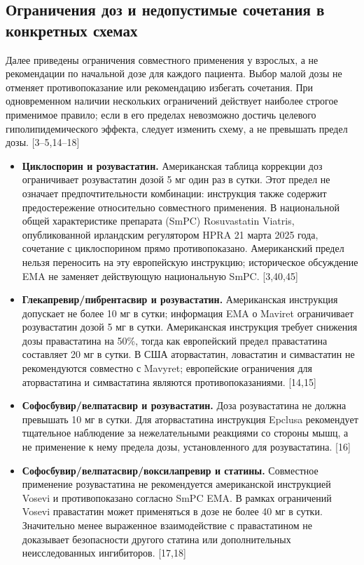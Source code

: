 \documentclass[11pt]{article}
\begin{document}
\subsection{Ограничения доз и недопустимые сочетания в конкретных схемах}

Далее приведены ограничения совместного применения у взрослых, а не рекомендации по начальной дозе для каждого пациента. Выбор малой дозы не отменяет противопоказание или рекомендацию избегать сочетания. При одновременном наличии нескольких ограничений действует наиболее строгое применимое правило; если в его пределах невозможно достичь целевого гиполипидемического эффекта, следует изменить схему, а не превышать предел дозы. [3--5,14--18]

\begin{itemize}
\item \textbf{Циклоспорин и розувастатин.} Американская таблица коррекции доз ограничивает розувастатин дозой 5 мг один раз в сутки. Этот предел не означает предпочтительности комбинации: инструкция также содержит предостережение относительно совместного применения. В национальной общей характеристике препарата (SmPC) Rosuvastatin Viatris, опубликованной ирландским регулятором HPRA 21 марта 2025 года, сочетание с циклоспорином прямо противопоказано. Американский предел нельзя переносить на эту европейскую инструкцию; историческое обсуждение EMA не заменяет действующую национальную SmPC. [3,40,45]
\item \textbf{Глекапревир/пибрентасвир и розувастатин.} Американская инструкция допускает не более 10 мг в сутки; информация EMA о Maviret ограничивает розувастатин дозой 5 мг в сутки. Американская инструкция требует снижения дозы правастатина на 50\%, тогда как европейский предел правастатина составляет 20 мг в сутки. В США аторвастатин, ловастатин и симвастатин не рекомендуются совместно с Mavyret; европейские ограничения для аторвастатина и симвастатина являются противопоказаниями. [14,15]
\item \textbf{Софосбувир/велпатасвир и розувастатин.} Доза розувастатина не должна превышать 10 мг в сутки. Для аторвастатина инструкция Epclusa рекомендует тщательное наблюдение за нежелательными реакциями со стороны мышц, а не применение к нему предела дозы, установленного для розувастатина. [16]
\item \textbf{Софосбувир/\allowbreak велпатасвир/\allowbreak воксилапревир и статины.} Совместное применение розувастатина не рекомендуется американской инструкцией Vosevi и противопоказано согласно SmPC EMA. В рамках ограничений Vosevi правастатин может применяться в дозе не более 40 мг в сутки. Значительно менее выраженное взаимодействие с правастатином не доказывает безопасности другого статина или дополнительных неисследованных ингибиторов. [17,18]

\end{itemize}
\end{document}
